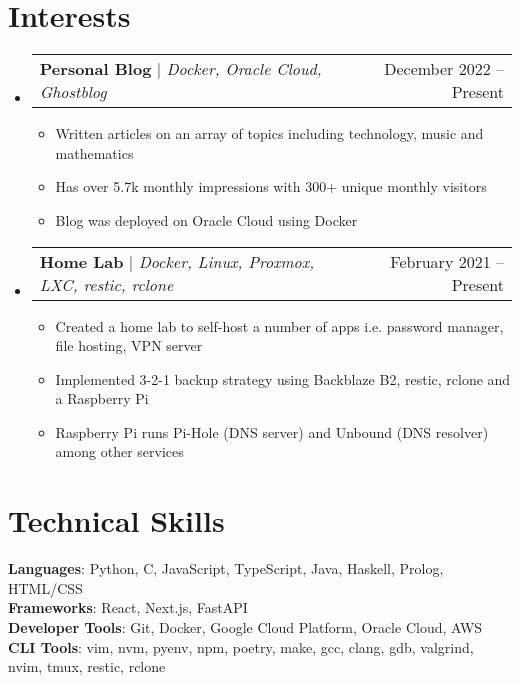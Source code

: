 \documentclass[letterpaper,11pt]{article}
\makeatletter
\newcommand{\resumeItem}[1]{
  \item\small{
    {#1 \vspace{-2pt}}
  }
}
\newcommand{\resumeProjectHeading}[2]{
    \item
    \begin{tabular*}{0.97\textwidth}{l@{\extracolsep{\fill}}r}
      \small#1 & #2 \\
    \end{tabular*}\vspace{-7pt}
}
\newcommand{\resumeSubHeadingListStart}{\begin{itemize}[leftmargin=0.15in, label={}]}
\newcommand{\resumeSubHeadingListEnd}{\end{itemize}}
\newcommand{\resumeItemListStart}{\begin{itemize}}
\newcommand{\resumeItemListEnd}{\end{itemize}\vspace{-5pt}}
\makeatother
\begin{document}
\section{Interests}
\resumeSubHeadingListStart
  \resumeProjectHeading
    {\textbf{Personal Blog} $|$ \emph{Docker, Oracle Cloud, Ghostblog}}{December 2022 -- Present}
    \resumeItemListStart
      \resumeItem{Written articles on an array of topics including technology, music and mathematics}
      \resumeItem{Has over 5.7k monthly impressions with 300+ unique monthly visitors}
      \resumeItem{Blog was deployed on Oracle Cloud using Docker}
  \resumeItemListEnd
  \resumeProjectHeading
  {\textbf{Home Lab} $|$ \emph{Docker, Linux, Proxmox, LXC, restic, rclone}}{February 2021 -- Present}
  \resumeItemListStart
    \resumeItem{Created a home lab to self-host a number of apps i.e. password manager, file hosting, VPN server}
    \resumeItem{Implemented 3-2-1 backup strategy using Backblaze B2, restic, rclone and a Raspberry Pi}
    \resumeItem{Raspberry Pi runs Pi-Hole (DNS server) and Unbound (DNS resolver) among other services}
  \resumeItemListEnd
\resumeSubHeadingListEnd

%
\section{Technical Skills}
 \begin{itemize}[leftmargin=0.15in, label={}]
    \small{\item{
     \textbf{Languages}{: Python, C, JavaScript, TypeScript, Java, Haskell, Prolog, HTML/CSS} \\
     \textbf{Frameworks}{: React, Next.js, FastAPI} \\
     \textbf{Developer Tools}{: Git, Docker, Google Cloud Platform, Oracle Cloud, AWS} \\
     \textbf{CLI Tools}{: vim, nvm, pyenv, npm, poetry, make, gcc, clang, gdb, valgrind, nvim, tmux, restic, rclone}
    }}
 \end{itemize}


\end{document}
